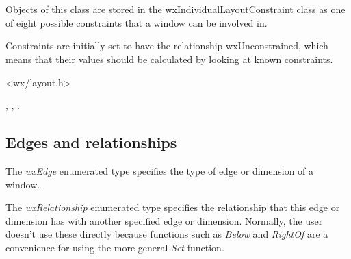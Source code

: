 \section{}\label{wxindividuallayoutconstraint}

Objects of this class are stored in the wxIndividualLayoutConstraint class
as one of eight possible constraints that a window can be involved in.

Constraints are initially set to have the relationship wxUnconstrained,
which means that their values should be calculated by looking at known constraints.




<wx/layout.h>


,\rtfsp
{}, .


\subsection{Edges and relationships}

The {\it wxEdge} enumerated type specifies the type of edge or dimension of a window.

\begin{twocollist}\itemsep=0pt
\end{twocollist}

The {\it wxRelationship} enumerated type specifies the relationship that
this edge or dimension has with another specified edge or dimension. Normally, the user
doesn't use these directly because functions such as {\it Below} and {\it RightOf} are a convenience
for using the more general {\it Set} function.

